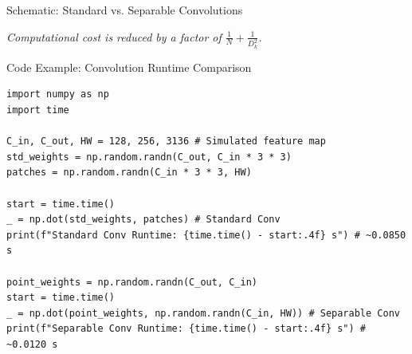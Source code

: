 \documentclass[aspectratio=169]{beamer}
\begin{document}
\begin{frame}{Schematic: Standard vs. Separable Convolutions}
    \begin{center}
    \end{center}
    
    \small \textit{Computational cost is reduced by a factor of $\frac{1}{N} + \frac{1}{D_k^2}$.}
\end{frame}

\begin{frame}[fragile]{Code Example: Convolution Runtime Comparison}
    \begin{lstlisting}
import numpy as np
import time

C_in, C_out, HW = 128, 256, 3136 # Simulated feature map
std_weights = np.random.randn(C_out, C_in * 3 * 3)
patches = np.random.randn(C_in * 3 * 3, HW)

start = time.time()
_ = np.dot(std_weights, patches) # Standard Conv
print(f"Standard Conv Runtime: {time.time() - start:.4f} s") # ~0.0850 s

point_weights = np.random.randn(C_out, C_in)
start = time.time()
_ = np.dot(point_weights, np.random.randn(C_in, HW)) # Separable Conv
print(f"Separable Conv Runtime: {time.time() - start:.4f} s") # ~0.0120 s
    \end{lstlisting}
\end{frame}
\end{document}
